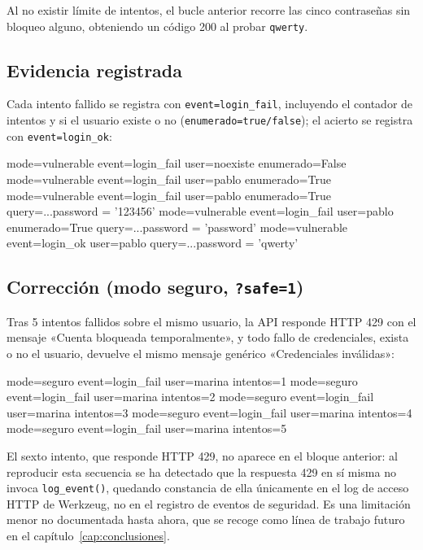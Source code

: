 Al no existir límite de intentos, el bucle anterior recorre las cinco
contraseñas sin bloqueo alguno, obteniendo un código 200 al probar
\texttt{qwerty}.

\subsection{Evidencia registrada}

Cada intento fallido se registra con \verb|event=login_fail|, incluyendo el
contador de intentos y si el usuario existe o no
(\verb|enumerado=true/false|); el acierto se registra con
\verb|event=login_ok|:

\begin{console}
mode=vulnerable event=login_fail user=noexiste enumerado=False
mode=vulnerable event=login_fail user=pablo    enumerado=True
mode=vulnerable event=login_fail user=pablo enumerado=True query=...password = '123456'
mode=vulnerable event=login_fail user=pablo enumerado=True query=...password = 'password'
mode=vulnerable event=login_ok   user=pablo    query=...password = 'qwerty'
\end{console}

\subsection{Corrección (modo seguro, \texttt{?safe=1})}

Tras 5 intentos fallidos sobre el mismo usuario, la API responde HTTP 429
con el mensaje «Cuenta bloqueada temporalmente», y todo fallo de
credenciales, exista o no el usuario, devuelve el mismo mensaje genérico
«Credenciales inválidas»:

\begin{console}
mode=seguro event=login_fail user=marina intentos=1
mode=seguro event=login_fail user=marina intentos=2
mode=seguro event=login_fail user=marina intentos=3
mode=seguro event=login_fail user=marina intentos=4
mode=seguro event=login_fail user=marina intentos=5
\end{console}

El sexto intento, que responde HTTP 429, no aparece en el bloque anterior:
al reproducir esta secuencia se ha detectado que la respuesta 429 en sí
misma no invoca \verb|log_event()|, quedando constancia de ella únicamente en el
log de acceso HTTP de Werkzeug, no en el registro de eventos de seguridad.
Es una limitación menor no documentada hasta ahora, que se recoge como
línea de trabajo futuro en el capítulo~\ref{cap:conclusiones}.

